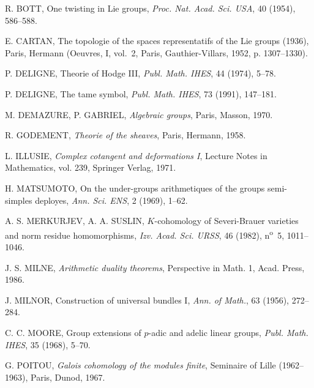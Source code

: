 \documentclass[11pt,a4paper]{article}
\theoremstyle{plain}
\theoremstyle{definition}
\begin{document}
\begin{enumerate}[label={[\arabic*]}, leftmargin=*, itemsep=0.5em]
\item R. BOTT, One twisting in Lie groups, \textit{Proc. Nat. Acad. Sci. USA}, 40 (1954), 586--588.

\item E. CARTAN, The topologie of the spaces representatifs of the Lie groups (1936), Paris, Hermann (Oeuvres, I, vol.~2, Paris, Gauthier-Villars, 1952, p. 1307--1330).

\item P. DELIGNE, Theorie of Hodge III, \textit{Publ. Math. IHES}, 44 (1974), 5--78.

\item P. DELIGNE, The tame symbol, \textit{Publ. Math. IHES}, 73 (1991), 147--181.

\item M. DEMAZURE, P. GABRIEL, \textit{Algebraic groups}, Paris, Masson, 1970.

\item R. GODEMENT, \textit{Theorie of the sheaves}, Paris, Hermann, 1958.

\item L. ILLUSIE, \textit{Complex cotangent and deformations I}, Lecture Notes in Mathematics, vol. 239, Springer Verlag, 1971.

\item H. MATSUMOTO, On the under-groups arithmetiques of the groups semi-simples deployes, \textit{Ann. Sci. ENS}, 2 (1969), 1--62.

\item A. S. MERKURJEV, A. A. SUSLIN, $K$-cohomology of Severi-Brauer varieties and norm residue homomorphisms, \textit{Izv. Acad. Sci. URSS}, 46 (1982), n\textsuperscript{o}~5, 1011--1046.

\item J. S. MILNE, \textit{Arithmetic duality theorems}, Perspective in Math. 1, Acad. Press, 1986.

\item J. MILNOR, Construction of universal bundles I, \textit{Ann. of Math.}, 63 (1956), 272--284.

\item C. C. MOORE, Group extensions of $p$-adic and adelic linear groups, \textit{Publ. Math. IHES}, 35 (1968), 5--70.

\item G. POITOU, \textit{Galois cohomology of the modules finite}, Seminaire of Lille (1962--1963), Paris, Dunod, 1967.


\end{enumerate}
\end{document}

